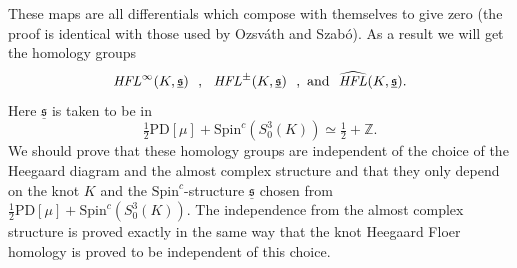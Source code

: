 \documentclass{gtart_h}
\theoremstyle{definition}
\newcommand\relspinc{\underline{\spinc}}
\newcommand{\spinc}{\mathfrak s}
\newcommand\HFL{\text{\it HFL\/}}
\newcommand{\Z}{\mathbb{Z}}
\newcommand{\SpinC}{{\mathrm{Spin}}^c}
\begin{document}
These maps are all differentials which compose with themselves to give zero
(the proof is identical with those used by Ozsv\'ath and Szab\'o).
As a result we will get the homology groups
$$
\HFL^\infty(K,\relspinc)\ \  ,\ \  \HFL^\pm(K,\relspinc)\ \ ,\text{ and }
\ \widehat{\HFL}(K,\relspinc).$$
Here $\relspinc$ is taken to be in
$$\tfrac{1}{2}\text{PD}[\mu]+\SpinC(S^3_0(K))\simeq  \tfrac{1}{2}+\Z.$$
We should prove that these homology groups are independent of the choice
of the Heegaard diagram and the almost complex structure and that they only
depend on the knot $K$ and the $\SpinC$-structure $\relspinc$ chosen from
$\frac{1}{2}\text{PD}[\mu]+\SpinC(S^3_0(K))$. The independence from the almost complex structure
is proved exactly in the same way that the knot Heegaard Floer homology
is proved to be independent of this choice.
\end{document}
